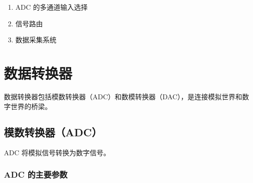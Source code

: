 \begin{enumerate}
  \item ADC 的多通道输入选择
  \item 信号路由
  \item 数据采集系统
\end{enumerate}

\section{数据转换器}

数据转换器包括模数转换器（ADC）和数模转换器（DAC），是连接模拟世界和数字世界的桥梁。

\subsection{模数转换器（ADC）}

ADC 将模拟信号转换为数字信号。

\subsubsection{ADC 的主要参数}

